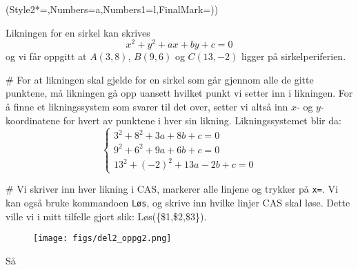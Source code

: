\begin{easylist}[enumerate]
	\ListProperties(Style2*=,Numbers=a,Numbers1=l,FinalMark={)})

	Likningen for en sirkel kan skrives 
	\begin{equation*}
		x^2 + y^2 + ax + by + c = 0
	\end{equation*}
	og vi får oppgitt at $A(3,8)$, $B(9,6)$ og $C(13,-2)$ ligger på sirkelperiferien. 
	
	# For at likningen skal gjelde for en sirkel som går gjennom alle de gitte punktene, må likningen gå opp uansett hvilket punkt vi setter inn i likningen. 
	For å finne et likningssystem som svarer til det over, setter vi altså inn $x$- og $y$-koordinatene for hvert av punktene i hver sin likning. 
	Likningssystemet blir da:
	\begin{equation*}
		\begin{cases} 3^2 + 8^2 + 3a + 8b + c = 0
		\\ 9^2 + 6^2 + 9a + 6b + c = 0 
		\\ 13^2 + (-2)^2 + 13a - 2b + c = 0 
		\end{cases}
	\end{equation*}
	
	# Vi skriver inn hver likning i CAS, markerer alle linjene og trykker på \verb|x=|. 
	Vi kan også bruke kommandoen \verb|Løs|, og skrive inn hvilke linjer CAS skal løse. 
	Dette ville vi i mitt tilfelle gjort slik: Løs(\{\$1,\$2,\$3\}).

	\begin{figure}[ht!]
		\centering
		\texttt{[image: figs/del2\_oppg2.png]}
		\label{fig:del1_oppg7}
	\end{figure}
	
	Så 
\end{easylist}


